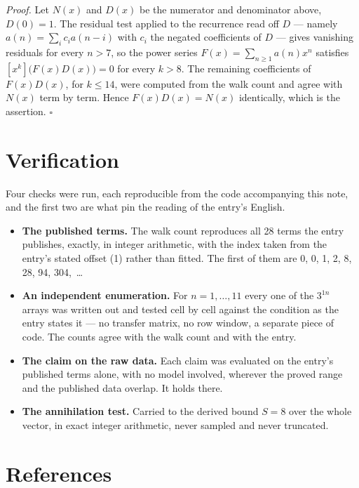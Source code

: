 \documentclass[11pt]{article}
\theoremstyle{definition}
\begin{document}
{\itshape Proof.} Let $N(x)$ and $D(x)$ be the numerator and denominator above, $D(0)=1$. The residual test applied to the recurrence read off $D$ --- namely $a(n) = \sum_i c_i a(n-i)$ with $c_i$ the negated coefficients of $D$ --- gives vanishing residuals for every $n > 7$, so the power series $F(x)=\sum_{n\ge 1}a(n)x^n$ satisfies $[x^k]\bigl(F(x)D(x)\bigr) = 0$ for every $k > 8$. The remaining coefficients of $F(x)D(x)$, for $k \le 14$, were computed from the walk count and agree with $N(x)$ term by term. Hence $F(x)D(x) = N(x)$ identically, which is the assertion. $\square$

\section{Verification}

Four checks were run, each reproducible from the code accompanying this note, and the first two are what pin the reading of the entry's English.

\begin{itemize}

\item {\bfseries The published terms.} The walk count reproduces all 28 terms the entry publishes, exactly, in integer arithmetic, with the index taken from the entry's stated offset (1) rather than fitted. The first of them are 0, 0, 1, 2, 8, 28, 94, 304,~\dots

\item {\bfseries An independent enumeration.} For $n = 1,\dots,11$ every one of the $3^{1n}$ arrays was written out and tested cell by cell against the condition as the entry states it --- no transfer matrix, no row window, a separate piece of code. The counts agree with the walk count and with the entry.

\item {\bfseries The claim on the raw data.} Each claim was evaluated on the entry's published terms alone, with no model involved, wherever the proved range and the published data overlap. It holds there.

\item {\bfseries The annihilation test.} Carried to the derived bound $S = 8$ over the whole vector, in exact integer arithmetic, never sampled and never truncated.

\end{itemize}

\section{References}
\end{document}
